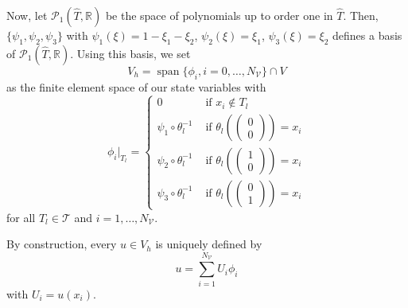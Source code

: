 Now, let $\mathcal{P}_1(\hat{T}, \mathbb{R})$ be the space of polynomials up to order one in $\hat{T}$. Then, $\{\psi_1, \psi_2, \psi_3\}$ with $\psi_1(\xi)=1-\xi_1-\xi_2$, $\psi_2(\xi)=\xi_1$, $\psi_3(\xi)=\xi_2$ defines a basis of $\mathcal{P}_1(\hat{T}, \mathbb{R})$.
Using this basis, we set
\begin{displaymath}
V_h=\operatorname*{span}\{\phi_i, i=0,\dotsc,N_\mathcal{V}\}\cap V
\end{displaymath}
as the finite element space of our state variables with
\begin{displaymath}
\phi_i|_{T_l}=\begin{cases}
0 & \text{ if $x_i\notin T_l$}\\
\psi_1 \circ \theta_l^{-1} & \text{ if $\theta_l\left(\begin{pmatrix} 0 \\ 0 \end{pmatrix}\right)=x_i$}\\
\psi_2 \circ \theta_l^{-1} & \text{ if $\theta_l\left(\begin{pmatrix} 1 \\ 0 \end{pmatrix}\right)=x_i$}\\
\psi_3 \circ \theta_l^{-1} & \text{ if $\theta_l\left(\begin{pmatrix} 0 \\ 1 \end{pmatrix}\right)=x_i$}
\end{cases} 
\end{displaymath}
for all $T_l\in\mathcal{T}$ and $i=1,\dotsc,N_\mathcal{V}$.

By construction, every $u\in V_h$ is uniquely defined by
\begin{equation}
\label{discretizedUSum}
u=\sum_{i=1}^{N_\mathcal{V}}U_i\phi_i
\end{equation}
with $U_i=u(x_i)$.\\

